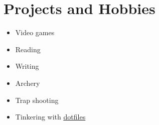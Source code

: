 \documentclass[letterpaper,10pt]{article}
\newcommand{\resumeSubHeadingListStart}{\begin{itemize}[leftmargin=*]}
\newcommand{\resumeSubHeadingListEnd}{\end{itemize}}
\newcommand{\shorterSection}[1]{\vspace{-10pt}\section{#1}}
\begin{document}
\shorterSection{Projects and Hobbies}
  \resumeSubHeadingListStart
  \small
    \item{Video games}
    \item{Reading}
    \item{Writing}
    \item{Archery}
    \item{Trap shooting}
    \item{Tinkering with \href{https://github.com/cynoclast/home/blob/master/.bash_profile}{\color{blue}\underline{dotfiles}}}
  \resumeSubHeadingListEnd

\end{document}
